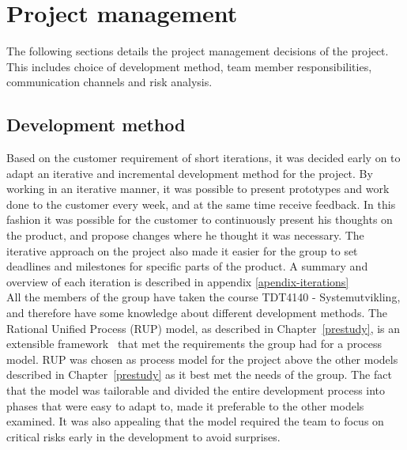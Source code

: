 \chapter{Project management}
The following sections details the project management decisions of the project. This includes choice of development method, team member responsibilities, communication channels and risk analysis.

\section{Development method}
\label{development-method}
Based on the customer requirement of short iterations, it was decided early on to adapt an iterative and incremental development method for the project. By working in an iterative manner, it was possible to present prototypes and work done to the customer every week, and at the same time receive feedback. In this fashion it was possible for the customer to continuously present his thoughts on the product, and propose changes where he thought it was necessary. The iterative approach on the project also made it easier for the group to set deadlines and milestones for specific parts of the product. A summary and overview of each iteration is described in appendix \ref{apendix-iterations}\\
\newline
All the members of the group have taken the course TDT4140 - Systemutvikling, and therefore have some knowledge about different development methods. The Rational Unified Process (RUP) model, as described in Chapter~\ref{prestudy}, is an extensible framework~\cite{kruchten} that met the requirements the group had for a process model. RUP was chosen as process model for the project above the other models described in Chapter~\ref{prestudy} as it best met the needs of the group. The fact that the model was tailorable and divided the entire development process into phases that were easy to adapt to, made it preferable to the other models examined. It was also appealing that the model required the team to focus on critical risks early in the development to avoid surprises.

